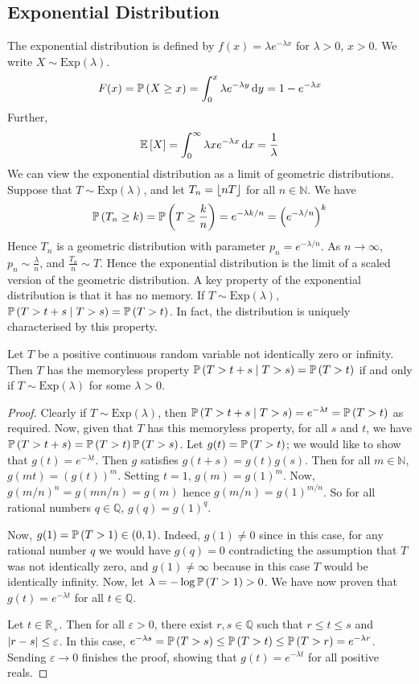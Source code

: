 \subsection{Exponential Distribution}
The exponential distribution is defined by \(f(x) = \lambda e^{-\lambda x}\) for \(\lambda > 0\), \(x > 0\).
We write \(X \sim \mathrm{Exp}(\lambda)\).
\[
	F(x) = \mathbb{P}\left({X \geq x}\right) = \int_0^x \lambda e^{-\lambda y} \dd{y} = 1 - e^{-\lambda x}
\]
Further,
\[
	\mathbb{E}\left[{X}\right] = \int_0^\infty \lambda x e^{-\lambda x} \dd{x} = \frac{1}{\lambda}
\]
We can view the exponential distribution as a limit of geometric distributions.
Suppose that \(T \sim \mathrm{Exp}(\lambda)\), and let \(T_n = \lfloor nT\rfloor\) for all \(n \in \mathbb N\).
We have
\[
	\mathbb{P}\left({T_n \geq k}\right) = \mathbb{P}\left({T \geq \frac{k}{n}}\right) = e^{-\lambda k / n} = \left( e^{-\lambda/n} \right)^k
\]
Hence \(T_n\) is a geometric distribution with parameter \(p_n = e^{-\lambda/n}\).
As \(n \to \infty\), \(p_n \sim \frac{\lambda}{n}\), and \(\frac{T_n}{n} \sim T\).
Hence the exponential distribution is the limit of a scaled version of the geometric distribution.
A key property of the exponential distribution is that it has no memory.
If \(T \sim \mathrm{Exp}(\lambda)\), \(\mathbb{P}\left({T > t + s \mid T > s}\right) = \mathbb{P}\left({T > t}\right)\).
In fact, the distribution is uniquely characterised by this property.
\begin{proposition}
	Let \(T\) be a positive continuous random variable not identically zero or infinity.
	Then \(T\) has the memoryless property \(\mathbb{P}\left({T > t + s \mid T > s}\right) = \mathbb{P}\left({T > t}\right)\) if and only if \(T \sim \mathrm{Exp}(\lambda)\) for some \(\lambda > 0\).
\end{proposition}
\begin{proof}
	Clearly if \(T \sim \mathrm{Exp}(\lambda)\), then \(\mathbb{P}\left({T > t + s \mid T > s}\right) = e^{-\lambda t} = \mathbb{P}\left({T > t}\right)\) as required.
	Now, given that \(T\) has this memoryless property, for all \(s\) and \(t\), we have \(\mathbb{P}\left({T > t + s}\right) = \mathbb{P}\left({T > t}\right) \mathbb{P}\left({T > s}\right)\).
	Let \(g(t) = \mathbb{P}\left({T > t}\right)\); we would like to show that \(g(t) = e^{-\lambda t}\).
	Then \(g\) satisfies \(g(t+s) = g(t)g(s)\).
	Then for all \(m \in \mathbb N\), \(g(mt) = (g(t))^m\).
	Setting \(t=1\), \(g(m) = g(1)^m\).
	Now, \(g(m/n)^n = g(mn/n) = g(m)\) hence \(g(m/n) = g(1)^{m/n}\).
	So for all rational numbers \(q \in \mathbb Q\), \(g(q) = g(1)^q\).

	Now, \(g(1) = \mathbb{P}\left({T > 1}\right) \in (0, 1)\).
	Indeed, \(g(1) \neq 0\) since in this case, for any rational number \(q\) we would have \(g(q) = 0\) contradicting the assumption that \(T\) was not identically zero, and \(g(1) \neq \infty\) because in this case \(T\) would be identically infinity.
	Now, let \(\lambda = -\log\mathbb{P}\left({T > 1}\right) > 0\).
	We have now proven that \(g(t) = e^{-\lambda t}\) for all \(t\in\mathbb Q\).

	Let \(t \in \mathbb R_+\).
	Then for all \(\varepsilon > 0\), there exist \(r, s \in \mathbb Q\) such that \(r \leq t \leq s\) and \(\abs{r - s} \leq \varepsilon\).
	In this case, \(e^{-\lambda s} = \mathbb{P}\left({T > s}\right) \leq \mathbb{P}\left({T > t}\right) \leq \mathbb{P}\left({T > r}\right) = e^{-\lambda r}\).
	Sending \(\varepsilon \to 0\) finishes the proof, showing that \(g(t) = e^{-\lambda t}\) for all positive reals.
\end{proof}

